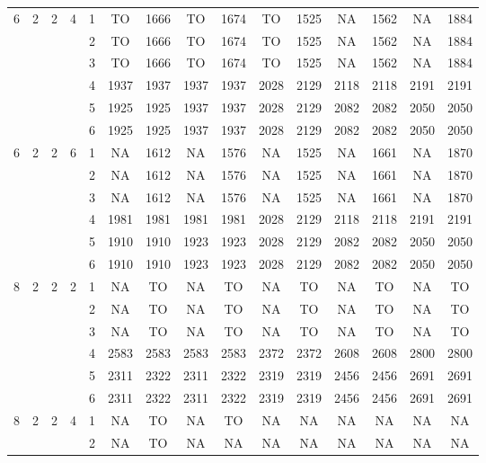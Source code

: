 \begin{longtable}{|c|c|c|c|c|c c|c c|c c|c c|c c|}
\hline
\multirow{6}{*}{6} & \multirow{6}{*}{2} & \multirow{6}{*}{2} & \multirow{6}{*}{4} & 1 & TO & 1666 & TO & 1674 & TO & 1525 & NA & 1562 & NA & 1884 \\
 & & & & 2 & TO & 1666 & TO & 1674 & TO & 1525 & NA & 1562 & NA & 1884 \\
 & & & & 3 & TO & 1666 & TO & 1674 & TO & 1525 & NA & 1562 & NA & 1884 \\
 & & & & 4 & 1937 & 1937 & 1937 & 1937 & 2028 & 2129 & 2118 & 2118 & 2191 & 2191 \\
 & & & & 5 & 1925 & 1925 & 1937 & 1937 & 2028 & 2129 & 2082 & 2082 & 2050 & 2050 \\
 & & & & 6 & 1925 & 1925 & 1937 & 1937 & 2028 & 2129 & 2082 & 2082 & 2050 & 2050 \\
\hline
\multirow{6}{*}{6} & \multirow{6}{*}{2} & \multirow{6}{*}{2} & \multirow{6}{*}{6} & 1 & NA & 1612 & NA & 1576 & NA & 1525 & NA & 1661 & NA & 1870 \\
 & & & & 2 & NA & 1612 & NA & 1576 & NA & 1525 & NA & 1661 & NA & 1870 \\
 & & & & 3 & NA & 1612 & NA & 1576 & NA & 1525 & NA & 1661 & NA & 1870 \\
 & & & & 4 & 1981 & 1981 & 1981 & 1981 & 2028 & 2129 & 2118 & 2118 & 2191 & 2191 \\
 & & & & 5 & 1910 & 1910 & 1923 & 1923 & 2028 & 2129 & 2082 & 2082 & 2050 & 2050 \\
 & & & & 6 & 1910 & 1910 & 1923 & 1923 & 2028 & 2129 & 2082 & 2082 & 2050 & 2050 \\
\hline
\multirow{6}{*}{8} & \multirow{6}{*}{2} & \multirow{6}{*}{2} & \multirow{6}{*}{2} & 1 & NA & TO & NA & TO & NA & TO & NA & TO & NA & TO \\
 & & & & 2 & NA & TO & NA & TO & NA & TO & NA & TO & NA & TO \\
 & & & & 3 & NA & TO & NA & TO & NA & TO & NA & TO & NA & TO \\
 & & & & 4 & 2583 & 2583 & 2583 & 2583 & 2372 & 2372 & 2608 & 2608 & 2800 & 2800 \\
 & & & & 5 & 2311 & 2322 & 2311 & 2322 & 2319 & 2319 & 2456 & 2456 & 2691 & 2691 \\
 & & & & 6 & 2311 & 2322 & 2311 & 2322 & 2319 & 2319 & 2456 & 2456 & 2691 & 2691 \\
\hline
\multirow{6}{*}{8} & \multirow{6}{*}{2} & \multirow{6}{*}{2} & \multirow{6}{*}{4} & 1 & NA & TO & NA & TO & NA & NA & NA & NA & NA & NA \\
 & & & & 2 & NA & TO & NA & NA & NA & NA & NA & NA & NA & NA \\

\end{longtable}
